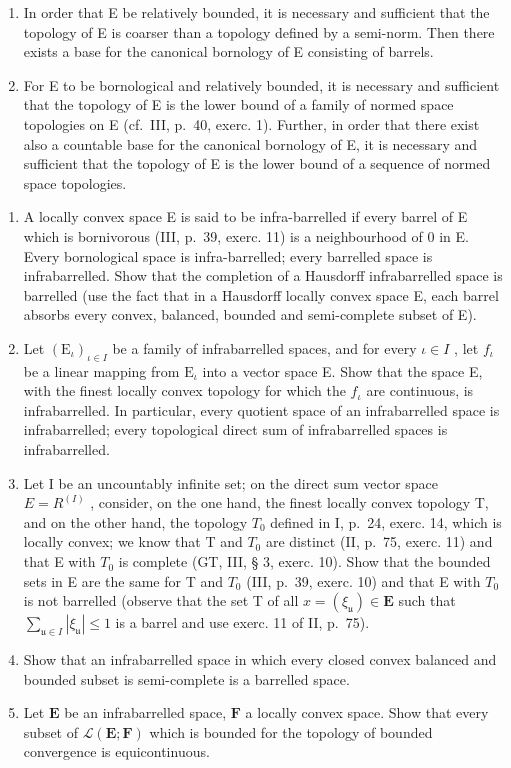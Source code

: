 \begin{enumerate}
\def\labelenumi{\alph{enumi})}
\item
  In order that E be relatively bounded, it is necessary and sufficient that the topology of E is coarser than a topology defined by a semi-norm. Then there exists a base for the canonical bornology of E consisting of barrels.
\item
  For E to be bornological and relatively bounded, it is necessary and sufficient that the topology of E is the lower bound of a family of normed space topologies on E (cf.~III, p.~40, exerc. 1). Further, in order that there exist also a countable base for the canonical bornology of E, it is necessary and sufficient that the topology of E is the lower bound of a sequence of normed space topologies.
\end{enumerate}

\begin{enumerate}
\def\labelenumi{\arabic{enumi})}
\setcounter{enumi}{6}
\item
  A locally convex space E is said to be infra-barrelled if every barrel of E which is bornivorous (III, p.~39, exerc. 11) is a neighbourhood of 0 in E. Every bornological space is infra-barrelled; every barrelled space is infrabarrelled. Show that the completion of a Hausdorff infrabarrelled space is barrelled (use the fact that in a Hausdorff locally convex space E, each barrel absorbs every convex, balanced, bounded and semi-complete subset of E).
\item
  Let \((\mathrm{E}_{\iota})_{\iota\in I}\) be a family of infrabarrelled spaces, and for every \(\iota\in I\) , let \(f_{\iota}\) be a linear mapping from \(\mathrm{E}_{\iota}\) into a vector space E. Show that the space E, with the finest locally convex topology for which the \(f_{\iota}\) are continuous, is infrabarrelled. In particular, every quotient space of an infrabarrelled space is infrabarrelled; every topological direct sum of infrabarrelled spaces is infrabarrelled.
\item
  Let I be an uncountably infinite set; on the direct sum vector space \(E = R^{(I)}\) , consider, on the one hand, the finest locally convex topology T, and on the other hand, the topology \(T_{0}\) defined in I, p.~24, exerc. 14, which is locally convex; we know that T and \(T_{0}\) are distinct (II, p.~75, exerc. 11) and that E with \(T_{0}\) is complete (GT, III, § 3, exerc. 10). Show that the bounded sets in E are the same for T and \(T_{0}\) (III, p.~39, exerc. 10) and that E with \(T_{0}\) is not barrelled (observe that the set T of all \(x = (\xi_{\mathfrak{u}}) \in \mathbf{E}\) such that \(\sum_{\mathfrak{u} \in I} |\xi_{\mathfrak{u}}| \leqslant 1\) is a barrel and use exerc. 11 of II, p.~75).
\item
  Show that an infrabarrelled space in which every closed convex balanced and bounded subset is semi-complete is a barrelled space.
\item
  Let \(\mathbf{E}\) be an infrabarrelled space, \(\mathbf{F}\) a locally convex space. Show that every subset of \(\mathcal{L}(\mathbf{E};\mathbf{F})\) which is bounded for the topology of bounded convergence is equicontinuous.
\end{enumerate}

